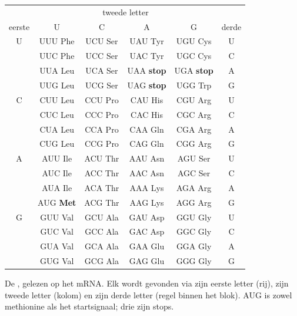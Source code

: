 \begin{omfigure}
\begin{tabular}{c|cccc|c}
\multicolumn{1}{c}{} & \multicolumn{4}{c}{\small tweede letter} & \multicolumn{1}{c}{} \\
{\small eerste} & U & C & A & G & {\small derde} \\ \hline
U & UUU Phe & UCU Ser & UAU Tyr & UGU Cys & U \\
 & UUC Phe & UCC Ser & UAC Tyr & UGC Cys & C \\
 & UUA Leu & UCA Ser & UAA \textbf{stop} & UGA \textbf{stop} & A \\
 & UUG Leu & UCG Ser & UAG \textbf{stop} & UGG Trp & G \\ \hline
C & CUU Leu & CCU Pro & CAU His & CGU Arg & U \\
 & CUC Leu & CCC Pro & CAC His & CGC Arg & C \\
 & CUA Leu & CCA Pro & CAA Gln & CGA Arg & A \\
 & CUG Leu & CCG Pro & CAG Gln & CGG Arg & G \\ \hline
A & AUU Ile & ACU Thr & AAU Asn & AGU Ser & U \\
 & AUC Ile & ACC Thr & AAC Asn & AGC Ser & C \\
 & AUA Ile & ACA Thr & AAA Lys & AGA Arg & A \\
 & AUG \textbf{Met} & ACG Thr & AAG Lys & AGG Arg & G \\ \hline
G & GUU Val & GCU Ala & GAU Asp & GGU Gly & U \\
 & GUC Val & GCC Ala & GAC Asp & GGC Gly & C \\
 & GUA Val & GCA Ala & GAA Glu & GGA Gly & A \\
 & GUG Val & GCG Ala & GAG Glu & GGG Gly & G \\
\end{tabular}

{\small De , gelezen op het mRNA. Elk  wordt gevonden
via zijn eerste letter (rij), zijn tweede letter (kolom) en zijn derde
letter (regel binnen het blok). AUG is zowel methionine als het
startsignaal; drie  zijn stops.}
\end{omfigure}

